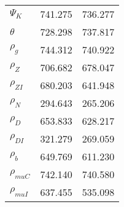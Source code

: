 \begin{center}
\begin{longtable}{lcc}
$ {\Psi_{K}}           $	 & 	     741.275	 & 	     736.277 \\ 
$ {\theta}             $	 & 	     728.298	 & 	     737.817 \\ 
$ {\rho_g}             $	 & 	     744.312	 & 	     740.922 \\ 
$ {\rho_Z}             $	 & 	     706.682	 & 	     678.047 \\ 
$ {\rho_{ZI}}          $	 & 	     680.203	 & 	     641.948 \\ 
$ {\rho_N}             $	 & 	     294.643	 & 	     265.206 \\ 
$ {\rho_D}             $	 & 	     653.833	 & 	     628.217 \\ 
$ {\rho_{DI}}          $	 & 	     321.279	 & 	     269.059 \\ 
$ {\rho_b}             $	 & 	     649.769	 & 	     611.230 \\ 
$ {\rho_{muC}}         $	 & 	     742.140	 & 	     740.580 \\ 
$ {\rho_{muI}}         $	 & 	     637.455	 & 	     535.098 \\ 
\end{longtable}
 \end{center}
